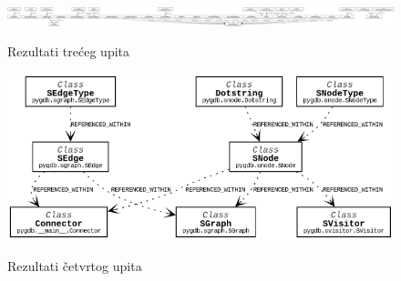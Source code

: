\begin{figure}[h]
    \includegraphics[angle=-90, scale=0.12]{assets/nasl.png}
    \label{fig:upit3}
    \centering
    \caption{Rezultati trećeg upita}
\end{figure}

\begin{figure}[h]
    \includegraphics[scale=0.5]{assets/klref.png}
    \label{fig:upit4}
    \centering
    \caption{Rezultati četvrtog upita}
\end{figure}

